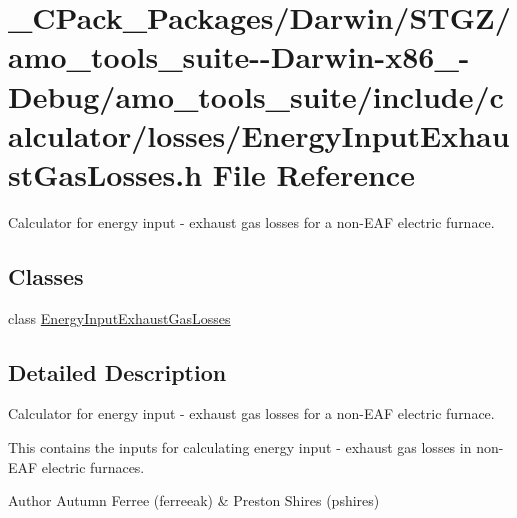 \hypertarget{___c_pack___packages_2_darwin_2_s_t_g_z_2amo__tools__suite--_darwin-x86__64-_debug_2amo__tools__d80a8488d282c1d3124d85a87479f30b}{}\section{\+\_\+\+C\+Pack\+\_\+\+Packages/\+Darwin/\+S\+T\+G\+Z/amo\+\_\+tools\+\_\+suite-\/-\/\+Darwin-\/x86\+\_-\/\+Debug/amo\+\_\+tools\+\_\+suite/include/calculator/losses/\+Energy\+Input\+Exhaust\+Gas\+Losses.h File Reference}
\label{___c_pack___packages_2_darwin_2_s_t_g_z_2amo__tools__suite--_darwin-x86__64-_debug_2amo__tools__d80a8488d282c1d3124d85a87479f30b}


Calculator for energy input -\/ exhaust gas losses for a non-\/\+E\+AF electric furnace.  


\subsection*{Classes}
\begin{DoxyCompactItemize}
\item 
class \hyperlink{class_energy_input_exhaust_gas_losses}{Energy\+Input\+Exhaust\+Gas\+Losses}
\end{DoxyCompactItemize}


\subsection{Detailed Description}
Calculator for energy input -\/ exhaust gas losses for a non-\/\+E\+AF electric furnace. 

This contains the inputs for calculating energy input -\/ exhaust gas losses in non-\/\+E\+AF electric furnaces.

\begin{DoxyAuthor}{Author}
Autumn Ferree (ferreeak) \& Preston Shires (pshires) 
\end{DoxyAuthor}
